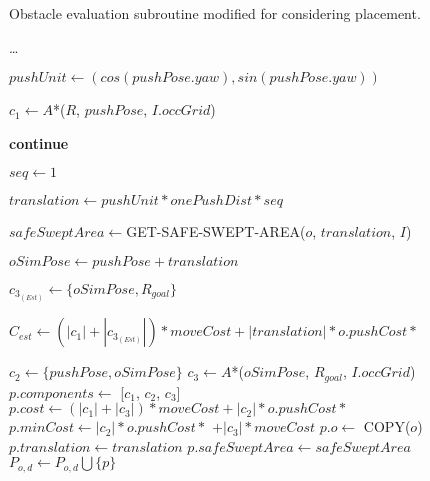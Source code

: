 \begin{algorithm}[H]
  \begin{algorithmic}[1]

    \caption{Obstacle evaluation subroutine modified for considering placement.}

    \label{alg:05-custom-placement-planforobstacle}


      \State \dots {}

        \State $pushUnit \gets (cos(pushPose.yaw), sin(pushPose.yaw))$

        \State $c_{1} \gets A$*($R$, $pushPose$, $I.occGrid$)

          \State \textbf{continue}
        \EndIf

        \State $seq \gets 1$

        \State $translation \gets pushUnit * onePushDist * seq$

        \State $safeSweptArea \gets $GET-SAFE-SWEPT-AREA($o$, $translation$, $I$)

        \State $oSimPose \gets pushPose + translation$

        \State {}

        \State $c_{3_{(Est)}} \gets \{oSimPose, R_{goal}\}$

        \State $C_{est} \gets (|c_{1}| + |c_{3_{(Est)}}|) * moveCost + |translation| * o.pushCost *$ 


            \State $c_{2} \gets \{pushPose, oSimPose\}$
            \State $c_{3} \gets A$*($oSimPose$, $R_{goal}$, $I.occGrid$)
              \State $p.components \gets$ [$c_{1}$, $c_{2}$, $c_{3}$]
              \State $p.cost \gets (|c_{1}| + |c_{3}|) * moveCost + |c_{2}| * o.pushCost *$ 
              \State $p.minCost \gets |c_{2}| * o.pushCost *$  $+ |c_{3}| * moveCost$
              \State $p.o \gets$ COPY($o$)
              \State $p.translation \gets translation$
              \State $p.safeSweptArea \gets safeSweptArea$
              \State $P_{o,d} \gets P_{o,d} \bigcup \{p\}$
            \EndIf


\end{algorithmic}
\end{algorithm}
